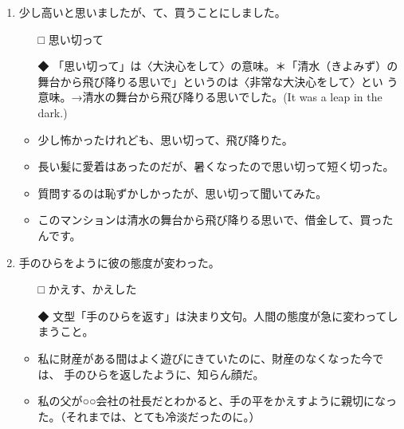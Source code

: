\documentclass[
uplatex,
b5paper,
10pt,
dvipdfmx
]{jsbook}
\begin{document}
\begin{enumerate}
\item 少し高いと思いましたが、\underline{\hspace{3zw}}て、買うことにしました。
\begin{itemize}
\item[□] 思い切って
\item[◆] 「思い切って」は〈大決心をして〉の意味。＊「清水（きよみず）の
	  舞台から飛び降りる思いで」というのは〈非常な大決心をして〉とい
	  う意味。→清水の舞台から飛び降りる思いでした。(It was a leap in the
	  dark.)
\end{itemize}
\begin{itemize}
 \item 少し怖かったけれども、思い切って、飛び降りた。
 \item 長い髪に愛着はあったのだが、暑くなったので思い切って短く切った。
 \item 質問するのは恥ずかしかったが、思い切って聞いてみた。
 \item このマンションは清水の舞台から飛び降りる思いで、借金して、買った
       んです。
\end{itemize}

\item 手のひらを\underline{\hspace{3zw}}ように彼の態度が変わった。
\begin{itemize}
\item[□] かえす、かえした
\item[◆] 文型「手のひらを返す」は決まり文句。人間の態度が急に変わってし
	  まうこと。
\end{itemize}
\begin{itemize}
 \item 私に財産がある間はよく遊びにきていたのに、財産のなくなった今では、
       手のひらを返したように、知らん顔だ。
 \item 私の父が○○会社の社長だとわかると、手の平をかえすように親切になっ
       た。（それまでは、とても冷淡だったのに。）
\end{itemize}
    

\end{enumerate}
\end{document}
